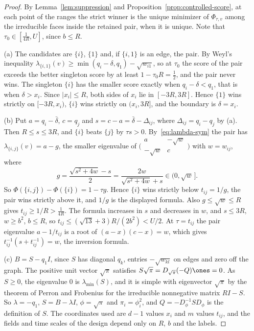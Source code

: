\begin{proof}
By Lemma~\ref{lem:suppression} and Proposition~\ref{prop:controlled-score}, at
each point of the ranges the strict winner is the unique minimizer of
$\Phi_{\tau,v}$ among the irreducible faces inside the retained pair, when it
is unique. Note that $\tau_0\in[\frac1{4R},U]$, since $b\le R$.

(a) The candidates are $\{i\}$, $\{1\}$ and, if $\{i,1\}$ is an edge, the pair.
By Weyl's inequality $\lambda_{\{i,1\}}(v)\ge\min(q_i-\delta,q_1)-\sqrt{w_{i1}}$,
so at $\tau_0$ the score of the pair exceeds the better singleton score by at
least $1-\tau_0R=\frac12$, and the pair never wins. The singleton $\{i\}$ has the
smaller score exactly when $q_i-\delta<q_1$, that is when $\delta>x_i$. Since
$|x_i|\le R$, both sides of $x_i$ lie in $[-3R,3R]$. Hence $\{1\}$ wins strictly
on $[-3R,x_i)$, $\{i\}$ wins strictly on $(x_i,3R]$, and the boundary is
$\delta=x_i$.

(b) Put $a=q_i-\bar\delta$, $c=q_j$ and $s=c-a=\bar\delta-\Delta_{ij}$, where
$\Delta_{ij}=q_i-q_j$ by (a). Then $R\le s\le3R$, and $\{i\}$ beats $\{j\}$ by
$\tau s>0$. By~\eqref{eq:lambda-sym} the pair has $\lambda_{\{i,j\}}(v)=a-g$, the
smaller eigenvalue of
$\bigl(\begin{smallmatrix}a&-\sqrt w\\-\sqrt w&c\end{smallmatrix}\bigr)$ with
$w=w_{ij}$, where
\[
 g=\frac{\sqrt{s^2+4w}-s}2=\frac{2w}{\sqrt{s^2+4w}+s}\in(0,\sqrt w\,] .
\]
So $\Phi(\{i,j\})-\Phi(\{i\})=1-\tau g$. Hence $\{i\}$ wins strictly below
$t_{ij}=1/g$, the pair wins strictly above it, and $1/g$ is the displayed
formula. Also $g\le\sqrt w\le R$ gives $t_{ij}\ge1/R>\frac1{4R}$. The formula
increases in $s$ and decreases in $w$, and $s\le3R$, $w\ge b^2$, $b\le R$, so
$t_{ij}\le(\sqrt{13}+3)R/(2b^2)<U/2$. At $\tau=t_{ij}$ the pair eigenvalue
$a-1/t_{ij}$ is a root of $(a-x)(c-x)=w$, which gives
$t_{ij}^{-1}(s+t_{ij}^{-1})=w$, the inversion formula.

(c) $B=S-q_1I$, since $S$ has diagonal $q_k$, entries $-\sqrt{w_{kl}}$ on edges
and zero off the graph. The positive unit vector $\sqrt\pi$ satisfies
$S\sqrt\pi=D_{\sqrt\pi}(-Q)\ones=0$. As $S\ge0$, the eigenvalue $0$ is
$\lambda_{\min}(S)$, and it is simple with eigenvector $\sqrt\pi$ by the theorem of
Perron and Frobenius for the irreducible nonnegative matrix $RI-S$. So
$\lambda=-q_1$, $S=B-\lambda I$, $\phi=\sqrt\pi$ and $\pi_i=\phi_i^2$, and
$Q=-D_\phi^{-1}SD_\phi$ is the definition of $S$. The coordinates used are $d-1$
values $x_i$ and $m$ values $t_{ij}$, and the fields and time scales of the design
depend only on $R$, $b$ and the labels.
\end{proof}

